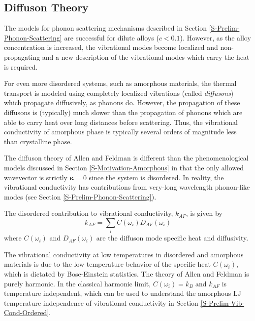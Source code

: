\documentclass[aps,prb,preprint,superscriptaddress,amsmath,amssymb,floatfix]{revtex4}
\begin{document}
\subsection{\label{S:Lifetimes}Diffuson Theory}
The models for phonon scattering mechanisms described in Section 
\ref{S-Prelim-Phonon-Scattering} are successful for dilute alloys 
($c<0.1$).\cite{klemens1955,klemens1957} However, as the alloy 
concentration is increased, the vibrational modes become localized and 
non-propagating and a new description of the vibrational modes which 
carry the heat is required. 

For even more disordered systems, such as 
amorphous materials, the thermal transport is modeled using completely 
localized vibrations (called \emph{diffusons}) which propagate diffusively, 
as phonons do.\cite{allen1993} However, the propagation of these diffusons 
is (typically) much slower than the propagation of phonons which are able 
to carry heat over long distances before scattering. Thus, the vibrational 
conductivity of amorphous phase is typically several orders of magnitude 
less than crystalline phase.\cite{freeman1986,cahill1992}

The diffuson theory of Allen and Feldman is different than the 
phenomenological models discussed in Section \ref{S-Motivation-Amorphous} 
in that the only allowed wavevector is strictly $\mathbf{\kappa}= 0$ since 
the system is disordered. In reality, the vibrational conductivity has 
contributions from very-long wavelength phonon-like modes (see Section 
\ref{S-Prelim-Phonon-Scattering}). 

The disordered contribution to 
vibrational conductivity, $k_{AF}$, is given by
\begin{equation}\label{EQ:M:k_AF}
k_{AF} = \sum_i C(\omega_i) D_{AF}(\omega_i)
\end{equation}
where $C(\omega_i)$ and $D_{AF}(\omega_i)$ are the diffuson mode specific 
heat and diffusivity. 

The vibrational conductivity at low temperatures in 
disordered and amorphous materials is due to the low temperature behavior 
of the specific heat $C(\omega_i)$, which is dictated by Bose-Einstein 
statistics.\cite{allen1993} The theory of Allen and Feldman is purely 
harmonic. In the classical harmonic limit, $C(\omega_i) = k_{B}$ and 
$k_{AF}$ is temperature independent, which can be used to understand the 
amorphous LJ temperature independence of vibrational conductivity in Section 
\ref{S-Prelim-Vib-Cond-Ordered}.
\end{document}
